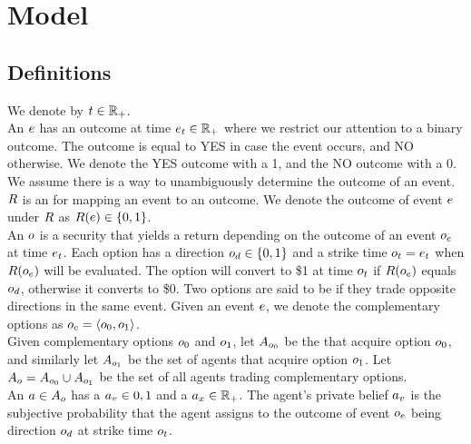\section{Model}

\subsection{Definitions}

We denote  by $t\in\mathbb{R}_+$. \\

An  $e$ has an outcome at time $e_t \in \mathbb{R}_+$ 
where we restrict our attention to a binary outcome. 
The outcome is equal to YES in case the event occurs, and NO otherwise. 
We denote the YES outcome with a 1, and the NO outcome with a 0.
We assume there is a way to unambiguously determine the outcome of an event. \\

$R$ is an  for mapping an event to an outcome.
We denote the outcome of event $e$ under $R$ as 
$R(e) \in \{0,1\}$.\\

An  $o$ is a security that yields a return depending on 
the outcome of an event $o_e$ at time $e_t$. Each option has a direction 
$o_d \in \{0, 1\}$ and a strike time $o_t = e_t$ 
when $R(o_e)$ will be evaluated. 
The option will convert to \$1 at time $o_t$ if $R(o_e)$ equals 
$o_d$, otherwise it converts to \$0. Two options are said to be
 if they trade opposite directions in the same event. Given an
event $e$, we denote the complementary options as 
$o_c = \left<o_{0}, o_{1}\right>$.\\

Given complementary options $o_{0}$ and $o_{1}$,
let $A_{o_0}$ be the  that acquire option
$o_{0}$, and similarly let $A_{o_1}$ be the set 
of agents that acquire option $o_{1}$. 
Let $A_o = A_{o_0} \cup A_{o_1}$
be the set of all agents trading complementary options.\\

An  $a\in A_o$ has a  
$a_v \in {0,1}$ 
and a  $a_x \in \mathbb{R}_+$.
The agent's private belief $a_v$ 
is the subjective probability that the agent
assigns to the outcome of event $o_e$ being direction $o_d$
at strike time $o_t$.\\

